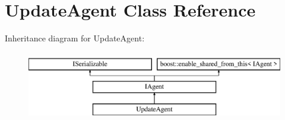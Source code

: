 \hypertarget{class_update_agent}{}\section{Update\+Agent Class Reference}
\label{class_update_agent}
Inheritance diagram for Update\+Agent\+:\begin{figure}[H]
\begin{center}
\leavevmode
\includegraphics[height=3.000000cm]{class_update_agent}
\end{center}
\end{figure}

